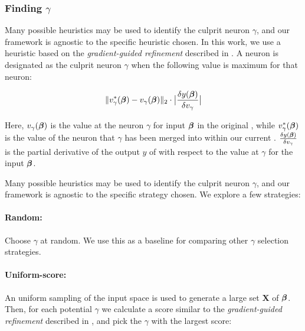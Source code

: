 \subsubsection{Finding $\gamma$}
\label{s:finding-gamma}

Many possible heuristics may be used to identify the culprit neuron $\gamma$,
and our framework is agnostic to the specific heuristic chosen. In this work, we
use a heuristic based on the \textit{gradient-guided refinement} described in
\cite{lin-comb-abs-jan}. A neuron is designated as the culprit neuron $\gamma$
when the following value is maximum for that neuron: 

\begin{equation*}
\begin{aligned}
    \|v^{*}_{\gamma}(\boldsymbol{\beta}) - v_{\gamma}(\boldsymbol{\beta})\|_{2} \cdot 
    \big| \frac{\delta y(\boldsymbol{\beta})}{\delta v_{\gamma}} \big|
\end{aligned}
\end{equation*}

Here, $v_{\gamma}(\boldsymbol{\beta})$ is the value at the neuron $\gamma$ for input
$\boldsymbol{\beta}$ in the original \cnc, while $v^{*}_{\gamma}(\boldsymbol{\beta})$ is the
value of the neuron that $\gamma$ has been merged into within our current \abs.
$\frac{\delta y(\boldsymbol{\beta})}{\delta v_{\gamma}}$ is the partial derivative of
the output
$y$ of \cnc with respect to the value at $\gamma$ for the input $\boldsymbol{\beta}$.


Many possible heuristics may be used to identify the culprit neuron $\gamma$,
and our framework is agnostic to the specific strategy chosen. We explore a few
strategies: 

\paragraph*{Random:} Choose $\gamma$ at random. We use this as a
baseline for comparing other $\gamma$ selection strategies. 

\paragraph*{Uniform-score:} An uniform sampling of the input space is used to
generate a large set $\mathbf{X}$ of \gencex $\boldsymbol{\beta}$. Then, for each
potential $\gamma$ we calculate a score similar to the \textit{gradient-guided
refinement} described in \cite{lin-comb-abs-jan}, and pick the $\gamma$ with the
largest score:

